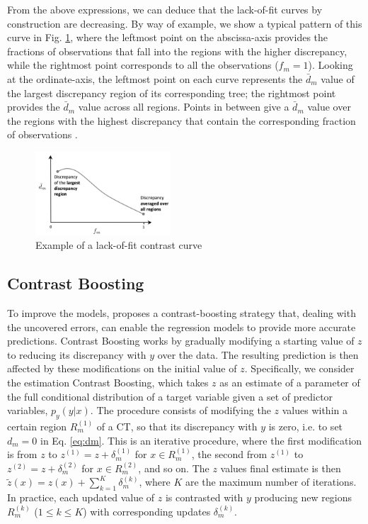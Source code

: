 \documentclass[fleqn,10pt]{wlscirep}
\begin{document}
From the above expressions, we can deduce that the lack-of-fit curves by construction are decreasing. By way of example, we show a typical pattern of this curve in Fig. \ref{fig:lof-ex}, where the leftmost point on the abscissa-axis provides the fractions of observations that fall into the regions with the higher discrepancy, while the rightmost point corresponds to all the observations ($f_m=1$).
Looking at the ordinate-axis, the leftmost point on each curve represents the $\bar{d}_m$ value of the largest discrepancy region of its corresponding tree; the rightmost point provides the $\bar{d}_m$ value across all regions. Points in between give a $\bar{d}_m$ value over the regions with the highest discrepancy that contain the corresponding fraction of observations \cite{Friedman2020}.
\begin{figure}[ht]
\centering
\includegraphics[width=0.45\textwidth]{lof_example.png}
\caption{Example of a lack-of-fit contrast curve}
\label{fig:lof-ex}
\end{figure}

\subsection*{Contrast Boosting}

To improve the models, \cite{Friedman2020} proposes a contrast-boosting strategy that, dealing with the uncovered errors, can enable the regression models to provide more accurate predictions. 
Contrast Boosting works by gradually modifying a starting value of $z$ to reducing its discrepancy with $y$ over the data. The resulting prediction is then affected by these modifications on the initial value of $z$.
Specifically, we consider the estimation Contrast Boosting, which takes $z$ as an estimate of a parameter of the full conditional distribution of a target variable given a set of predictor variables, $p_y(y | x)$.
The procedure consists of modifying the $z$ values within a certain region $R_m^{(1)}$ of a CT, so that its discrepancy with $y$ is zero, i.e. to set $d_m=0$ in Eq. \ref{eq:dm}.
This is an iterative procedure, where the first modification is from $z$ to $z^{(1)}=z+\delta^{(1)}_m$ for $x\in R^{(1)}_m$, the second from $z^{(1)}$ to $z^{(2)}=z+\delta^{(2)}_m$ for $x\in R^{(2)}_m$, and so on.
The $z$ values final estimate is then $\tilde{z}(x)=z(x)+\sum_{k=1}^{K}\delta_{m}^{(k)}$, where $K$ are the maximum number of iterations. In practice, each updated value of $z$ is contrasted with $y$ producing new regions $R^{(k)}_m$ ($1\leq k\leq K$) with corresponding updates $\delta_{m}^{(k)}$.
\end{document}
